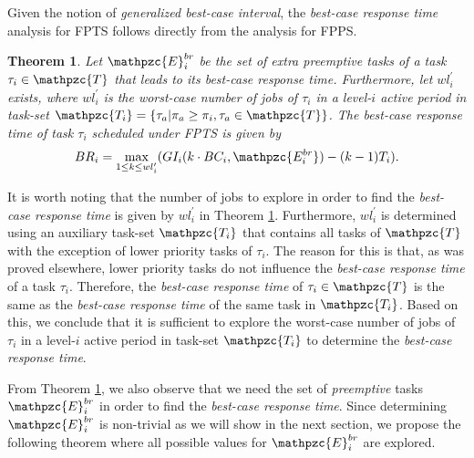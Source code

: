 \documentclass[fleqn]{article}
\newtheorem{theorem}{Theorem}
\begin{document}
Given the notion of \textit{generalized best-case interval}, the \textit{best-case response time} analysis for FPTS follows directly from the analysis for FPPS.

\begin{theorem} \label{thm:bcrt_fpts_1}
	Let $\mathpzc{E}^{br}_i$ be the set of \textit{extra preemptive} tasks of a task $\tau_i\in \mathpzc{T}$ that leads to its best-case response time. Furthermore, let $wl^{\prime}_i$ exists, where $wl^{\prime}_i$ is the worst-case number of jobs of $\tau_i$ in a level-$i$ active period in task-set $\mathpzc{T_i}=\{\tau_a | \pi_a \geq \pi_i, \tau_a \in \mathpzc{T} \}$. The best-case response time of task $\tau_i$ scheduled under FPTS is given by 
	\begin{align}
	BR_i = \max \limits_{1 \leq k \leq wl^{\prime}_i} (GI_i(k \cdot BC_i, \mathpzc{E^{br}_i}) - (k-1)T_i).
	\end{align} 
\end{theorem}

It is worth noting that the number of jobs to explore in order to find the \textit{best-case response time} is given by $wl^{\prime}_i$ in Theorem \ref{thm:bcrt_fpts_1}. Furthermore, $wl^{\prime}_i$ is determined using an auxiliary task-set $\mathpzc{T_i}$ that contains all tasks of $\mathpzc{T}$ with the exception of lower priority tasks of $\tau_i$. The reason for this is that, as was proved elsewhere, lower priority tasks do not influence the \textit{best-case response time} of a task $\tau_i$. Therefore, the \textit{best-case response time} of $\tau_i \in \mathpzc{T}$ is the same as the \textit{best-case response time} of the same task in $\mathpzc{T_i}$. Based on this, we conclude that it is sufficient to explore the worst-case number of jobs of $\tau_i$ in a level-$i$ active period in task-set $\mathpzc{T_i}$ to determine the \textit{best-case response time}.

From Theorem \ref{thm:bcrt_fpts_1}, we also observe that we need the set of \textit{preemptive} tasks $\mathpzc{E}^{br}_i$ in order to find the \textit{best-case response time}. Since determining $\mathpzc{E}^{br}_i$ is non-trivial as we will show in the next section, we propose the following theorem where all possible values for $\mathpzc{E}^{br}_i$ are explored.
\end{document}
